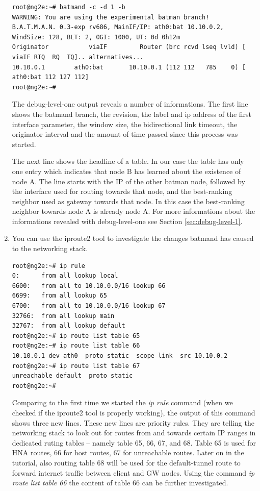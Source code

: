 \documentclass[11pt]{article}
\begin{document}
\begin{enumerate}
\begin{small} \begin{verbatim}
root@ng2e:~# batmand -c -d 1 -b
WARNING: You are using the experimental batman branch!
B.A.T.M.A.N. 0.3-exp rv686, MainIF/IP: ath0:bat 10.10.0.2, WindSize: 128, BLT: 2, OGI: 1000, UT: 0d 0h12m
Originator           viaIF         Router (brc rcvd lseq lvld) [    viaIF RTQ  RQ  TQ].. alternatives...
10.10.0.1        ath0:bat       10.10.0.1 (112 112   785    0) [ ath0:bat 112 127 112]
root@ng2e:~#
\end{verbatim} \end{small}

The debug-level-one output reveals a number of informations. The first line shows the batmand branch, the revision, the label and ip address of the first interface parameter, the window size, the bidirectional link timeout, the originator interval and the amount of time passed since this process was started.

The next line shows the headline of a table.
In our case the table has only one entry which indicates that node B has learned about the existence of node A.
The line starts with the IP of the other batman node, followed by the interface used for routing towards that node, and the best-ranking neighbor used as gateway towards that node. In this case the best-ranking neighbor towards node A is already node A.
For more informations about the informations revealed with debug-level-one see Section \ref{sec:debug-level-1}.

\item You can use the iproute2 tool to investigate the changes batmand has caused to the networking stack.

\begin{small} \begin{verbatim}
root@ng2e:~# ip rule
0:      from all lookup local
6600:   from all to 10.10.0.0/16 lookup 66
6699:   from all lookup 65
6700:   from all to 10.10.0.0/16 lookup 67
32766:  from all lookup main
32767:  from all lookup default
root@ng2e:~# ip route list table 65
root@ng2e:~# ip route list table 66
10.10.0.1 dev ath0  proto static  scope link  src 10.10.0.2
root@ng2e:~# ip route list table 67
unreachable default  proto static
root@ng2e:~#
\end{verbatim} \end{small}

Comparing to the first time we started the \emph{ip rule} command (when we checked if the iproute2 tool is properly working), the output of this command shows three new lines.
These new lines are priority rules.
They are telling the networking stack to look out for routes from and towards certain IP ranges in dedicated ruting tables -- namely table 65, 66, 67, and 68.
%
Table 65 is used for HNA routes, 66 for host routes, 67 for unreachable routes.
Later on in the tutorial, also routing table 68 will be used for the default-tunnel route to forward internet traffic between client and GW nodes.
%
Using the command \emph{ip route list table 66} the content of table 66 can be further investigated.


\end{enumerate}
\end{document}
